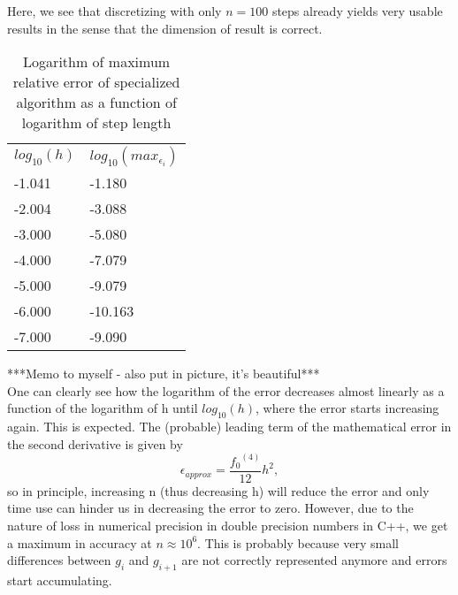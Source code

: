 \documentclass[10pt,a4paper]{article}
\begin{document}
Here, we see that discretizing with only $n=100$ steps already yields very usable results in the sense that the dimension of result is correct.
\begin{table}[H]
\caption[Relative error of specialized algorithm]{Logarithm of maximum relative error of specialized algorithm as a function of logarithm of step length}
\begin{tabular}{ll}
$log_{10}(h)$ &  $log_{10}(max_{\epsilon_i})$ \\
 -1.041 & -1.180 \\
 -2.004 & -3.088 \\
 -3.000 & -5.080 \\
 -4.000 & -7.079 \\
 -5.000 & -9.079 \\
 -6.000 & -10.163 \\
 -7.000 & -9.090 

\end{tabular}
\end{table}
***Memo to myself - also put in picture, it's beautiful***\\
One can clearly see how the logarithm of the error decreases almost linearly as a function of the logarithm of h until $log_{10}(h)$, where the error starts increasing again. This is expected. The (probable) leading term of the mathematical error in the second derivative is given by $$\epsilon_{approx}=\frac{{f_0}^{(4)}}{12}h^2,$$ so in principle, increasing n (thus decreasing h) will reduce the error and only time use can hinder us in decreasing the error to zero. However, due to the nature of loss in numerical precision in double precision numbers in C++, we get a maximum in accuracy at $n \approx 10^6$.  This is probably because very small differences between $g_i$ and $g_{i+1}$
 are not correctly represented anymore and errors start accumulating.
\end{document}
